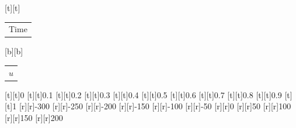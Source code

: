 %    
%
%
\begin{psfrags}%
\psfragscanon%
%
[t][t]{\setlength{\tabcolsep}{0pt}\begin{tabular}{c}Time\end{tabular}}%
[b][b]{\setlength{\tabcolsep}{0pt}\begin{tabular}{c}$u$\end{tabular}}%
%
[t][t]{0}%
[t][t]{0.1}%
[t][t]{0.2}%
[t][t]{0.3}%
[t][t]{0.4}%
[t][t]{0.5}%
[t][t]{0.6}%
[t][t]{0.7}%
[t][t]{0.8}%
[t][t]{0.9}%
[t][t]{1}%
%
[r][r]{-300}%
[r][r]{-250}%
[r][r]{-200}%
[r][r]{-150}%
[r][r]{-100}%
[r][r]{-50}%
[r][r]{0}%
[r][r]{50}%
[r][r]{100}%
[r][r]{150}%
[r][r]{200}%
%
%
\end{psfrags}%
%
